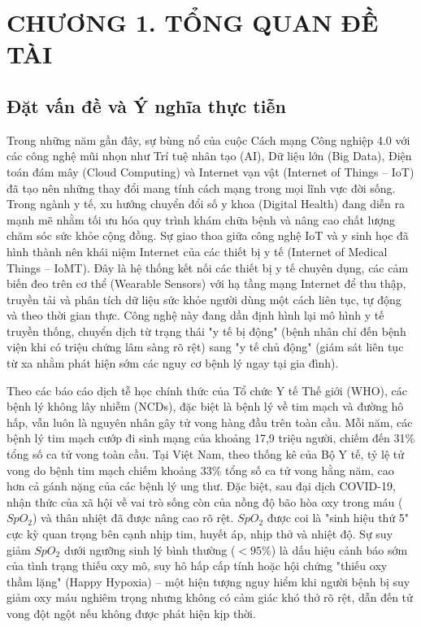 \section*{CHƯƠNG 1. TỔNG QUAN ĐỀ TÀI}
\setcounter{section}{1}
\setcounter{subsection}{0}
\setcounter{figure}{0}
\setcounter{table}{0}

\subsection{Đặt vấn đề và Ý nghĩa thực tiễn}

Trong những năm gần đây, sự bùng nổ của cuộc Cách mạng Công nghiệp 4.0 với các công nghệ mũi nhọn như Trí tuệ nhân tạo (AI), Dữ liệu lớn (Big Data), Điện toán đám mây (Cloud Computing) và Internet vạn vật (Internet of Things -- IoT) đã tạo nên những thay đổi mang tính cách mạng trong mọi lĩnh vực đời sống. Trong ngành y tế, xu hướng chuyển đổi số y khoa (Digital Health) đang diễn ra mạnh mẽ nhằm tối ưu hóa quy trình khám chữa bệnh và nâng cao chất lượng chăm sóc sức khỏe cộng đồng. Sự giao thoa giữa công nghệ IoT và y sinh học đã hình thành nên khái niệm Internet của các thiết bị y tế (Internet of Medical Things -- IoMT). Đây là hệ thống kết nối các thiết bị y tế chuyên dụng, các cảm biến đeo trên cơ thể (Wearable Sensors) với hạ tầng mạng Internet để thu thập, truyền tải và phân tích dữ liệu sức khỏe người dùng một cách liên tục, tự động và theo thời gian thực. Công nghệ này đang dần định hình lại mô hình y tế truyền thống, chuyển dịch từ trạng thái "y tế bị động" (bệnh nhân chỉ đến bệnh viện khi có triệu chứng lâm sàng rõ rệt) sang "y tế chủ động" (giám sát liên tục từ xa nhằm phát hiện sớm các nguy cơ bệnh lý ngay tại gia đình).

Theo các báo cáo dịch tễ học chính thức của Tổ chức Y tế Thế giới (WHO), các bệnh lý không lây nhiễm (NCDs), đặc biệt là bệnh lý về tim mạch và đường hô hấp, vẫn luôn là nguyên nhân gây tử vong hàng đầu trên toàn cầu. Mỗi năm, các bệnh lý tim mạch cướp đi sinh mạng của khoảng 17,9 triệu người, chiếm đến 31\% tổng số ca tử vong toàn cầu. Tại Việt Nam, theo thống kê của Bộ Y tế, tỷ lệ tử vong do bệnh tim mạch chiếm khoảng 33\% tổng số ca tử vong hằng năm, cao hơn cả gánh nặng của các bệnh lý ung thư. Đặc biệt, sau đại dịch COVID-19, nhận thức của xã hội về vai trò sống còn của nồng độ bão hòa oxy trong máu ($SpO_2$) và thân nhiệt đã được nâng cao rõ rệt. $SpO_2$ được coi là "sinh hiệu thứ 5" cực kỳ quan trọng bên cạnh nhịp tim, huyết áp, nhịp thở và nhiệt độ. Sự suy giảm $SpO_2$ dưới ngưỡng sinh lý bình thường ($<95\%$) là dấu hiệu cảnh báo sớm của tình trạng thiếu oxy mô, suy hô hấp cấp tính hoặc hội chứng "thiếu oxy thầm lặng" (Happy Hypoxia) -- một hiện tượng nguy hiểm khi người bệnh bị suy giảm oxy máu nghiêm trọng nhưng không có cảm giác khó thở rõ rệt, dẫn đến tử vong đột ngột nếu không được phát hiện kịp thời.

